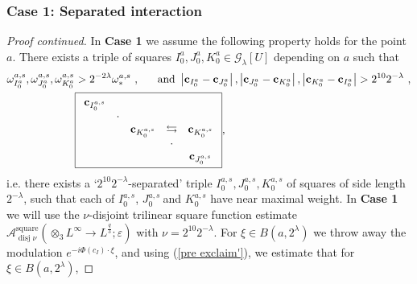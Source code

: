 \documentclass{amsart}%
\theoremstyle{plain}
\numberwithin{equation}{section}
\begin{document}
\subsubsection{Case 1: Separated interaction\label{Sub Case 1}}

\begin{proof}
[Proof continued]In \textbf{Case 1} we assume the following property holds for
the point $a$. There exists a triple of squares $I_{0}^{a},J_{0}^{a},K_{0}%
^{a}\in\mathcal{G}_{\lambda}\left[  U\right]  $ depending on $a$ such that%
\begin{align*}
\omega_{I_{0}^{a}}^{a,s},\omega_{J_{0}^{a}}^{a,s},\omega_{K_{0}^{a}}^{a,s}  &
>2^{-2\lambda}\omega_{\ast}^{a,s}\ ,\ \ \ \ \ \text{and }\left\vert
\mathbf{c}_{I_{0}^{a}}-\mathbf{c}_{J_{0}^{a}}\right\vert ,\left\vert
\mathbf{c}_{J_{0}^{a}}-\mathbf{c}_{K_{0}^{a}}\right\vert ,\left\vert
\mathbf{c}_{K_{0}^{a}}-\mathbf{c}_{I_{0}^{a}}\right\vert >2^{10}2^{-\lambda
}\ ,\\
&  \fbox{$%
\begin{array}
[c]{ccccc}%
\mathbf{c}_{I_{0}^{a,s}} &  &  &  & \\
& \cdot &  &  & \\
&  & \mathbf{c}_{K_{0}^{a,s}} & \leftrightarrows & \mathbf{c}_{K_{0}^{a,s}}\\
&  &  & \cdot & \\
&  &  &  & \mathbf{c}_{J_{0}^{a,s}}%
\end{array}
$},
\end{align*}
i.e. there exists a `$2^{10}2^{-\lambda}$-separated' triple $I_{0}^{a,s}%
,J_{0}^{a,s},K_{0}^{a,s}$ of squares of side length $2^{-\lambda} $, such that
each of $I_{0}^{a,s}$, $J_{0}^{a,s}\ $and $K_{0}^{a,s}$ have near maximal
weight. In \textbf{Case 1} we will use the $\nu$-disjoint trilinear square
function estimate $\mathcal{A}_{\operatorname*{disj}\nu}%
^{\operatorname*{square}}\left(  \otimes_{3}L^{\infty}\rightarrow L^{\frac
{q}{3}};\varepsilon\right)  $ with $\nu=2^{10}2^{-\lambda}$. For $\xi\in
B\left(  a,2^{\lambda}\right)  $ we throw away the modulation $e^{-i\Phi
\left(  c_{I}\right)  \cdot\xi}$, and using (\ref{pre exclaim'}), we estimate
that for $\xi\in B\left(  a,2^{\lambda}\right)  $,%


\end{proof}
\end{document}
